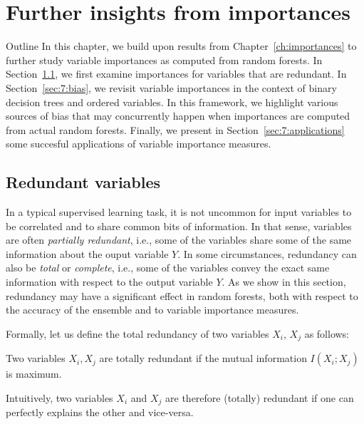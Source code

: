 \chapter{Further insights from importances}\label{ch:applications}

\begin{remark}{Outline}
In this chapter, we build upon results from Chapter~\ref{ch:importances} to
further study variable importances as computed from random forests. In
Section~\ref{sec:7:redundant}, we first examine importances for variables that
are redundant. In Section~\ref{sec:7:bias}, we revisit variable importances in
the context of binary decision trees and ordered variables. In this framework, we
highlight various sources of bias that may concurrently happen when
importances are computed from actual random forests. Finally, we present in
Section~\ref{sec:7:applications} some succesful applications
of variable importance measures.
\end{remark}


\section{Redundant variables}
\label{sec:7:redundant}

In a typical supervised learning task, it is not uncommon for input variables
to be correlated and to share common bits of information. In that sense,
variables are often \textit{partially redundant}, i.e., some of the variables
share some of the same information about the ouput variable $Y$. In some
circumstances, redundancy can also be \textit{total}  or
\textit{complete}, i.e., some of the variables convey the exact same
information with respect to the output variable $Y$. As we show in this
section, redundancy may have a significant effect in random forests, both with
respect to the accuracy of the ensemble and to variable importance measures.

Formally, let us define the total redundancy of two variables $X_i$, $X_j$ as
follows:

\begin{definition}
Two variables $X_i, X_j$ are totally redundant if the mutual information $I(X_i;X_j)$ is maximum.
\end{definition}

Intuitively, two variables $X_i$ and $X_j$ are therefore (totally) redundant
if one can perfectly explains the other and vice-versa.


